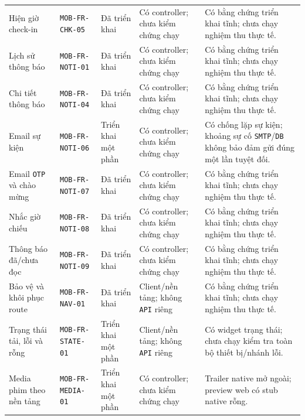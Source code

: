 \begin{longtable}{@{}P{0.19000\SRSWidth}P{0.18000\SRSWidth}P{0.15000\SRSWidth}P{0.20000\SRSWidth}P{0.28000\SRSWidth}@{}}
Hiện giờ check-in & \texttt{MOB-\allowbreak{}FR-\allowbreak{}CHK-\allowbreak{}05} & Đã triển khai & Có controller; chưa kiểm chứng chạy & Có bằng chứng triển khai tĩnh; chưa chạy nghiệm thu thực tế. \\[3pt]
Lịch sử thông báo & \texttt{MOB-\allowbreak{}FR-\allowbreak{}NOTI-\allowbreak{}01} & Đã triển khai & Có controller; chưa kiểm chứng chạy & Có bằng chứng triển khai tĩnh; chưa chạy nghiệm thu thực tế. \\[3pt]
Chi tiết thông báo & \texttt{MOB-\allowbreak{}FR-\allowbreak{}NOTI-\allowbreak{}04} & Đã triển khai & Có controller; chưa kiểm chứng chạy & Có bằng chứng triển khai tĩnh; chưa chạy nghiệm thu thực tế. \\[3pt]
Email sự kiện & \texttt{MOB-\allowbreak{}FR-\allowbreak{}NOTI-\allowbreak{}06} & Triển khai một phần & Có controller; chưa kiểm chứng chạy & Có chống lặp sự kiện; khoảng sự cố \texttt{SMTP}/\allowbreak{}\texttt{DB} không bảo đảm gửi đúng một lần tuyệt đối. \\[3pt]
Email \texttt{OTP} và chào mừng & \texttt{MOB-\allowbreak{}FR-\allowbreak{}NOTI-\allowbreak{}07} & Đã triển khai & Có controller; chưa kiểm chứng chạy & Có bằng chứng triển khai tĩnh; chưa chạy nghiệm thu thực tế. \\[3pt]
Nhắc giờ chiếu & \texttt{MOB-\allowbreak{}FR-\allowbreak{}NOTI-\allowbreak{}08} & Đã triển khai & Có controller; chưa kiểm chứng chạy & Có bằng chứng triển khai tĩnh; chưa chạy nghiệm thu thực tế. \\[3pt]
Thông báo đã/\allowbreak{}chưa đọc & \texttt{MOB-\allowbreak{}FR-\allowbreak{}NOTI-\allowbreak{}09} & Đã triển khai & Có controller; chưa kiểm chứng chạy & Có bằng chứng triển khai tĩnh; chưa chạy nghiệm thu thực tế. \\[3pt]
Bảo vệ và khôi phục route & \texttt{MOB-\allowbreak{}FR-\allowbreak{}NAV-\allowbreak{}01} & Đã triển khai & Client/\allowbreak{}nền tảng; không \texttt{API} riêng & Có bằng chứng triển khai tĩnh; chưa chạy nghiệm thu thực tế. \\[3pt]
Trạng thái tải, lỗi và rỗng & \texttt{MOB-\allowbreak{}FR-\allowbreak{}STATE-\allowbreak{}01} & Triển khai một phần & Client/\allowbreak{}nền tảng; không \texttt{API} riêng & Có widget trạng thái; chưa chạy kiểm tra toàn bộ thiết bị/\allowbreak{}nhánh lỗi. \\[3pt]
Media phim theo nền tảng & \texttt{MOB-\allowbreak{}FR-\allowbreak{}MEDIA-\allowbreak{}01} & Triển khai một phần & Có controller; chưa kiểm chứng chạy & Trailer native mở ngoài; preview web có stub native rỗng. \\[3pt]
\end{longtable}
\endgroup

